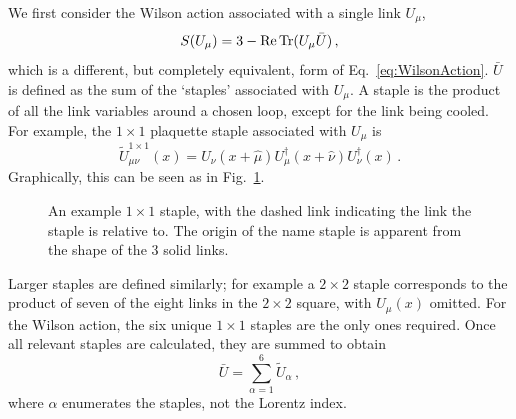 We first consider the Wilson action associated with a single link $U_\mu$, 
%
\begin{equation}
S(U_\mu) = 3 - \operatorname{Re}\operatorname{Tr} (U_\mu \bar{U})\, ,
\label{eq:WilsonActionCool}
\end{equation}
%
which is a different, but completely equivalent, form of Eq.~\ref{eq:WilsonAction}. $\bar{U}$ is defined as the sum of the `staples' associated with $U_\mu$.  A staple is the product of all the link variables around a chosen loop, except for the link being cooled. For example, the $1\times 1$ plaquette staple associated with $U_\mu$ is
%
\begin{equation}
\tilde { U }^{1\times 1} _ { \mu \nu}(x) = U _ { \nu } ( x + \hat { \mu } ) U _ { \mu } ^ { \dagger } ( x + \hat { \nu } ) U _ { \nu } ^ { \dagger } ( x )\, .
\end{equation}
%
Graphically, this can be seen as in Fig.~\ref{fig:Staple}.
%
\begin{figure}[h!]
\centering

\caption{\label{fig:Staple} An example $1\times 1$ staple, with the dashed link indicating the link the staple is relative to. The origin of the name staple is apparent from the shape of the 3 solid links.}
\end{figure}
%
Larger staples are defined similarly; for example a $2\times 2$ staple corresponds to the product of seven of the eight links in the $2\times 2$ square, with $U_\mu(x)$ omitted. For the Wilson action, the six unique $1\times 1$ staples are the only ones required. Once all relevant staples are calculated, they are summed to obtain
%
\begin{equation}
\bar{U} = \sum_{\alpha = 1} ^ 6 \tilde{U}_\alpha\, ,
\label{eq:Staples}
\end{equation}
where $\alpha$ enumerates the staples, not the Lorentz index.\\
%

